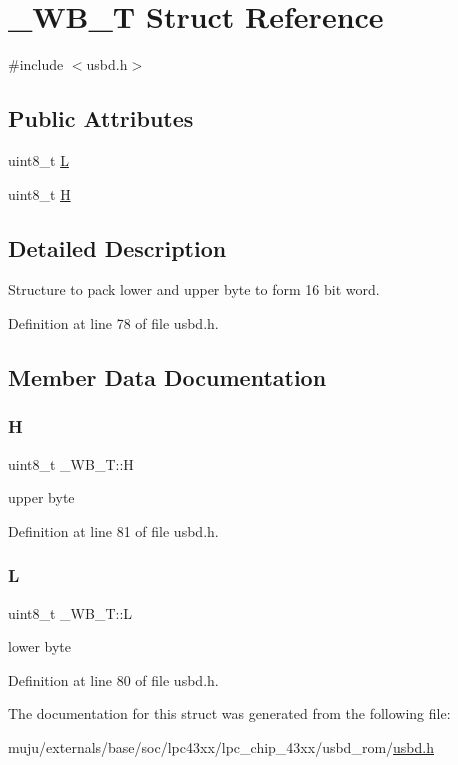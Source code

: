 \hypertarget{struct___w_b___t}{}\section{\+\_\+\+W\+B\+\_\+T Struct Reference}
\label{struct___w_b___t}


{\ttfamily \#include $<$usbd.\+h$>$}

\subsection*{Public Attributes}
\begin{DoxyCompactItemize}
\item 
uint8\+\_\+t \hyperlink{struct___w_b___t_a29f33d98a209b8353b29f66cd48de5e8}{L}
\item 
uint8\+\_\+t \hyperlink{struct___w_b___t_af5f6d47d99f6e1c34cde41a71607d09d}{H}
\end{DoxyCompactItemize}


\subsection{Detailed Description}
Structure to pack lower and upper byte to form 16 bit word. 

Definition at line 78 of file usbd.\+h.



\subsection{Member Data Documentation}
\mbox{\label{struct___w_b___t_af5f6d47d99f6e1c34cde41a71607d09d}} 
\subsubsection{\texorpdfstring{H}{H}}
{\footnotesize\ttfamily uint8\+\_\+t \+\_\+\+W\+B\+\_\+\+T\+::H}

upper byte 

Definition at line 81 of file usbd.\+h.

\mbox{\label{struct___w_b___t_a29f33d98a209b8353b29f66cd48de5e8}} 
\subsubsection{\texorpdfstring{L}{L}}
{\footnotesize\ttfamily uint8\+\_\+t \+\_\+\+W\+B\+\_\+\+T\+::L}

lower byte 

Definition at line 80 of file usbd.\+h.



The documentation for this struct was generated from the following file\+:\begin{DoxyCompactItemize}
\item 
muju/externals/base/soc/lpc43xx/lpc\+\_\+chip\+\_\+43xx/usbd\+\_\+rom/\hyperlink{usbd_8h}{usbd.\+h}\end{DoxyCompactItemize}
